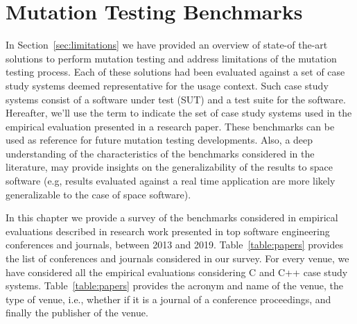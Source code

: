
\chapter{Mutation Testing Benchmarks}
\label{chapter:industry}

In Section~\ref{sec:limitations} we have provided an overview of state-of the-art solutions to perform mutation testing and address limitations of the mutation testing process.
Each of these solutions had been evaluated against a set of case study systems deemed representative for the usage context. Such case study systems consist of a software under test (SUT) and a test suite for the software.
Hereafter, we'll use the term  to indicate the set of case study systems used in the empirical evaluation presented in a research paper.
These benchmarks can be used as reference for future mutation testing developments. 
Also, a deep understanding of the characteristics of the benchmarks considered in the literature, may provide insights on the generalizability of the results to space software (e.g, results evaluated against a real time application are more likely generalizable to the case of space software).




In this chapter we provide a survey of the benchmarks considered in empirical evaluations described in research work presented in top software engineering conferences and journals, between 2013 and 2019. Table~\ref{table:papers} provides the list of conferences and journals considered in our survey. For every venue, we have considered all the empirical evaluations considering C and C++ case study systems. Table~\ref{table:papers} provides the acronym and name of the venue, the type of venue, i.e., whether if it is a journal of a conference proceedings, and finally the publisher of the venue. 



